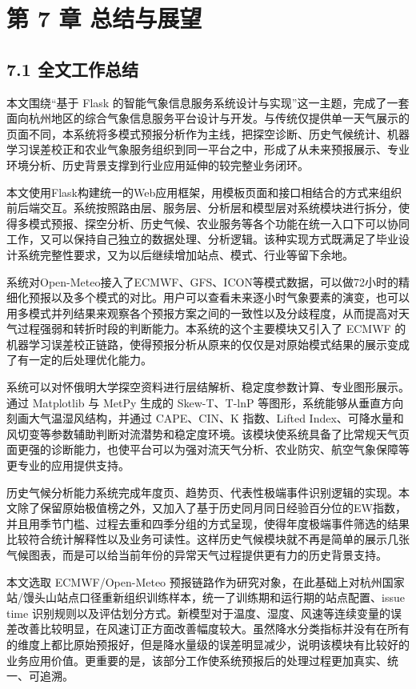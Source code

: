 \section{第 7 章 总结与展望}

\subsection{7.1 全文工作总结}

本文围绕“基于 Flask 的智能气象信息服务系统设计与实现”这一主题，完成了一套面向杭州地区的综合气象信息服务平台设计与开发。与传统仅提供单一天气展示的页面不同，本系统将多模式预报分析作为主线，把探空诊断、历史气候统计、机器学习误差校正和农业气象服务组织到同一平台之中，形成了从未来预报展示、专业环境分析、历史背景支撑到行业应用延伸的较完整业务闭环。

本文使用Flask构建统一的Web应用框架，用模板页面和接口相结合的方式来组织前后端交互。系统按照路由层、服务层、分析层和模型层对系统模块进行拆分，使得多模式预报、探空分析、历史气候、农业服务等各个功能在统一入口下可以协同工作，又可以保持自己独立的数据处理、分析逻辑。该种实现方式既满足了毕业设计系统完整性要求，又为以后继续增加站点、模式、行业等留下余地。

系统对Open-Meteo接入了ECMWF、GFS、ICON等模式数据，可以做72小时的精细化预报以及多个模式的对比。用户可以查看未来逐小时气象要素的演变，也可以用多模式并列结果来观察各个预报方案之间的一致性以及分歧程度，从而提高对天气过程强弱和转折时段的判断能力。本系统的这个主要模块又引入了 ECMWF 的机器学习误差校正链路，使得预报分析从原来的仅仅是对原始模式结果的展示变成了有一定的后处理优化能力。

系统可以对怀俄明大学探空资料进行层结解析、稳定度参数计算、专业图形展示。通过 Matplotlib 与 MetPy 生成的 Skew-T、T-lnP 等图形，系统能够从垂直方向刻画大气温湿风结构，并通过 CAPE、CIN、K 指数、Lifted Index、可降水量和风切变等参数辅助判断对流潜势和稳定度环境。该模块使系统具备了比常规天气页面更强的诊断能力，也使平台可以为强对流天气分析、农业防灾、航空气象保障等更专业的应用提供支持。

历史气候分析能力系统完成年度页、趋势页、代表性极端事件识别逻辑的实现。本文除了保留原始极值榜之外，又加入了基于历史同月同日经验百分位的EW指数，并且用季节门槛、过程去重和四季分组的方式呈现，使得年度极端事件筛选的结果比较符合统计解释性以及业务可读性。这样历史气候模块就不再是简单的展示几张气候图表，而是可以给当前年份的异常天气过程提供更有力的历史背景支持。

本文选取 ECMWF/Open-Meteo 预报链路作为研究对象，在此基础上对杭州国家站/馒头山站点口径重新组织训练样本，统一了训练期和运行期的站点配置、issue time 识别规则以及评估划分方式。新模型对于温度、湿度、风速等连续变量的误差改善比较明显，在风速订正方面改善幅度较大。虽然降水分类指标并没有在所有的维度上都比原始预报好，但是降水量级的误差明显减少，说明该模块有比较好的业务应用价值。更重要的是，该部分工作使系统预报后的处理过程更加真实、统一、可追溯。

